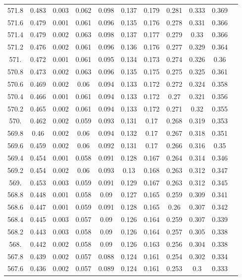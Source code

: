 \documentclass[12pt]{ctexart}
\numberwithin{equation}{section}
\begin{document}
\begin{longtable}{ccccccccccc}
571.8	&	0.483	&	0.003	&	0.062	&	0.098	&	0.137	&	0.179	&	0.281	&	0.333	&	0.369	\\
571.6	&	0.479	&	0.001	&	0.061	&	0.096	&	0.135	&	0.176	&	0.278	&	0.331	&	0.366	\\
571.4	&	0.479	&	0.002	&	0.063	&	0.098	&	0.137	&	0.177	&	0.279	&	0.33	&	0.366	\\
571.2	&	0.476	&	0.002	&	0.061	&	0.096	&	0.136	&	0.176	&	0.277	&	0.329	&	0.364	\\
571.	&	0.472	&	0.001	&	0.061	&	0.095	&	0.134	&	0.173	&	0.274	&	0.326	&	0.36	\\
570.8	&	0.473	&	0.002	&	0.063	&	0.096	&	0.135	&	0.175	&	0.275	&	0.325	&	0.361	\\
570.6	&	0.469	&	0.002	&	0.06	&	0.094	&	0.133	&	0.172	&	0.272	&	0.324	&	0.358	\\
570.4	&	0.466	&	0.001	&	0.061	&	0.094	&	0.133	&	0.172	&	0.27	&	0.321	&	0.356	\\
570.2	&	0.465	&	0.002	&	0.061	&	0.094	&	0.133	&	0.172	&	0.271	&	0.32	&	0.355	\\
570.	&	0.462	&	0.002	&	0.059	&	0.093	&	0.131	&	0.17	&	0.268	&	0.319	&	0.353	\\
569.8	&	0.46	&	0.002	&	0.06	&	0.094	&	0.132	&	0.17	&	0.267	&	0.318	&	0.351	\\
569.6	&	0.459	&	0.002	&	0.06	&	0.092	&	0.131	&	0.17	&	0.266	&	0.316	&	0.35	\\
569.4	&	0.454	&	0.001	&	0.058	&	0.091	&	0.128	&	0.167	&	0.264	&	0.314	&	0.346	\\
569.2	&	0.454	&	0.002	&	0.06	&	0.093	&	0.13	&	0.168	&	0.263	&	0.312	&	0.347	\\
569.	&	0.453	&	0.003	&	0.059	&	0.091	&	0.129	&	0.167	&	0.263	&	0.312	&	0.345	\\
568.8	&	0.448	&	0.001	&	0.058	&	0.09	&	0.127	&	0.165	&	0.259	&	0.309	&	0.341	\\
568.6	&	0.447	&	0.001	&	0.059	&	0.091	&	0.128	&	0.165	&	0.26	&	0.307	&	0.342	\\
568.4	&	0.445	&	0.003	&	0.057	&	0.09	&	0.126	&	0.164	&	0.259	&	0.307	&	0.339	\\
568.2	&	0.443	&	0.003	&	0.058	&	0.09	&	0.126	&	0.164	&	0.257	&	0.305	&	0.338	\\
568.	&	0.442	&	0.002	&	0.058	&	0.09	&	0.126	&	0.163	&	0.256	&	0.304	&	0.338	\\
567.8	&	0.439	&	0.002	&	0.057	&	0.088	&	0.124	&	0.161	&	0.254	&	0.302	&	0.334	\\
567.6	&	0.436	&	0.002	&	0.057	&	0.089	&	0.124	&	0.161	&	0.253	&	0.3	&	0.333	\\

\end{longtable}
\end{document}
